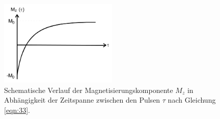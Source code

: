 \begin{figure}
  \centering
  \includegraphics[width=0.5\textwidth]{M_z.PNG}
  \caption{Schematische Verlauf der Magnetisierungskomponente $M_z$
    in Abhängigkeit der Zeitspanne zwischen den Pulsen $\tau$ nach Gleichung \eqref{eqn:33}.\cite{sample}}
  \label{fig:M_z}
\end{figure}
%
